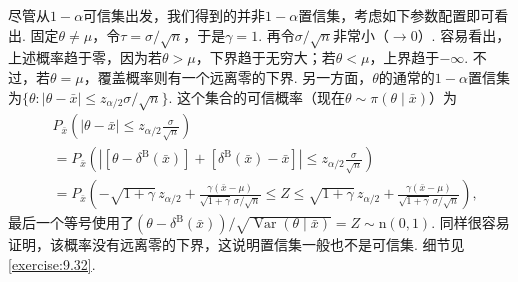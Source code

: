 \begin{example}[正态可信集的覆盖]
尽管从$1-\alpha$可信集出发，我们得到的并非$1-\alpha$置信集，考虑如下参数配置即可看出. 固定$\theta\ne\mu$，令$\tau=\sigma/\sqrt n$，于是$\gamma=1$. 再令$\sigma/\sqrt n$非常小（$\to0$）. 容易看出，上述概率趋于零，因为若$\theta>\mu$，下界趋于无穷大；若$\theta<\mu$，上界趋于$-\infty$. 不过，若$\theta=\mu$，覆盖概率则有一个远离零的下界.
另一方面，$\theta$的通常的$1-\alpha$置信集为$\{\theta:|\theta-\bar x|\le z_{\alpha/2}\sigma/\sqrt n\}$. 这个集合的可信概率（现在$\theta\sim\pi(\theta\mid\bar x)$）为
$$\begin{aligned}
&P_{\bar x}\left(|\theta-\bar x|\le z_{\alpha/2}\frac\sigma{\sqrt n}\right)\\
&=P_{\bar x}\left(\left|[\theta-\delta^{\mathrm B}(\bar x)]+[\delta^{\mathrm B}(\bar x)-\bar x]\right|\le z_{\alpha/2}\frac\sigma{\sqrt n}\right)\\
&=P_{\bar x}\left(-\sqrt{1+\gamma}\,z_{\alpha/2}+\frac{\gamma(\bar x-\mu)}{\sqrt{1+\gamma}\,\sigma/\sqrt n}\le Z\le\sqrt{1+\gamma}\,z_{\alpha/2}+\frac{\gamma(\bar x-\mu)}{\sqrt{1+\gamma}\,\sigma/\sqrt n}\right),
\end{aligned}$$
最后一个等号使用了$(\theta-\delta^{\mathrm B}(\bar x))/\sqrt{\operatorname{Var}(\theta\mid\bar x)}=Z\sim\mathrm n(0,1)$. 同样很容易证明，该概率没有远离零的下界，这说明置信集一般也不是可信集. 细节见\autoref{exercise:9.32}.
\end{example}
